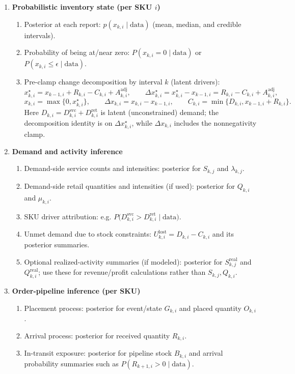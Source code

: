 \documentclass[11pt]{article}
\begin{document}
\begin{enumerate}
  \item \textbf{Probabilistic inventory state (per SKU $i$)}
  \begin{enumerate}
    \item Posterior at each report: $p(x_{k,i}\mid\text{data})$ (mean, median, and credible intervals).
    \item Probability of being at/near zero: $P(x_{k,i}=0\mid\text{data})$ or $P(x_{k,i}\le \epsilon\mid\text{data})$.
    \item Pre-clamp change decomposition by interval $k$ (latent drivers):
    \[
      x^\star_{k,i}=x_{k-1,i}+R_{k,i}-C_{k,i}+A^{\mathrm{adj}}_{k,i},\qquad
      \Delta x^\star_{k,i}=x^\star_{k,i}-x_{k-1,i}=R_{k,i}-C_{k,i}+A^{\mathrm{adj}}_{k,i},
    \]
    \[
      x_{k,i}=\max\{0,x^\star_{k,i}\},\qquad
      \Delta x_{k,i}=x_{k,i}-x_{k-1,i},\qquad
      C_{k,i}=\min\{D_{k,i},x_{k-1,i}+R_{k,i}\}.
    \]
    Here $D_{k,i}=D^{\mathrm{svc}}_{k,i}+D^{\mathrm{ret}}_{k,i}$ is latent (unconstrained) demand; the decomposition identity is on $\Delta x^\star_{k,i}$, while $\Delta x_{k,i}$ includes the nonnegativity clamp.
  \end{enumerate}

  \item \textbf{Demand and activity inference}
  \begin{enumerate}
    \item Demand-side service counts and intensities: posterior for $S_{k,j}$ and $\lambda_{k,j}$.
    \item Demand-side retail quantities and intensities (if used): posterior for $Q_{k,i}$ and $\mu_{k,i}$.
    \item SKU driver attribution: e.g.
    $P\bigl(D^{\mathrm{svc}}_{k,i} > D^{\mathrm{ret}}_{k,i}\mid\text{data}\bigr)$.
    \item Unmet demand due to stock constraints:
    $U^{\mathrm{lost}}_{k,i}=D_{k,i}-C_{k,i}$ and its posterior summaries.
    \item Optional realized-activity summaries (if modeled): posterior for $S^{\mathrm{real}}_{k,j}$ and $Q^{\mathrm{real}}_{k,i}$; use these for revenue/profit calculations rather than $S_{k,j},Q_{k,i}$.
  \end{enumerate}

  \item \textbf{Order-pipeline inference (per SKU)}
  \begin{enumerate}
    \item Placement process: posterior for event/state $G_{k,i}$ and placed quantity $O_{k,i}$.
    \item Arrival process: posterior for received quantity $R_{k,i}$.
    \item In-transit exposure: posterior for pipeline stock $B_{k,i}$ and arrival probability summaries such as $P(R_{k+1,i}>0\mid\text{data})$.
  \end{enumerate}


\end{enumerate}
\end{document}

